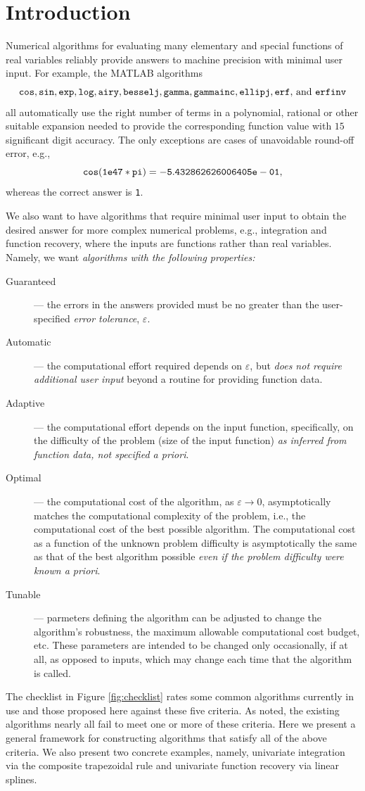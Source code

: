 \documentclass[]{elsarticle}
\theoremstyle{definition}
\theoremstyle{remark}
\begin{document}
\section{Introduction}

Numerical algorithms for evaluating many elementary and special functions of real variables reliably provide answers to machine precision with minimal user input.  For example, the MATLAB \cite{MAT7.12} algorithms
\[
{\tt cos, sin, exp, log, airy, besselj, gamma, gammainc, ellipj, erf,} \text{ and } {\tt  erfinv}
\] 
all automatically use the right number of terms in a polynomial, rational or other suitable expansion needed to provide the corresponding function value with $15$ significant digit accuracy. The only exceptions are cases of unavoidable round-off error, e.g., 
\[
{\tt cos(1e47*pi)= -5.432862626006405e-01},
\]
whereas the correct answer is {\tt 1}.

We also want to have algorithms that require minimal user input to obtain the desired answer for more complex numerical problems, e.g., integration and function recovery, where the inputs are functions rather than real variables.  Namely, we want \emph{algorithms with the following properties:}
\begin{description}
\item[Guaranteed]--- the errors in the answers provided must be no greater than the user-specified \emph{error tolerance}, $\varepsilon$.
\item[Automatic]--- the computational effort required depends on $\varepsilon$, but \emph{does not require additional user input} beyond a routine for providing function data.
\item[Adaptive]--- the computational effort depends on the input function, specifically, on the difficulty of the problem (size of the input function) \emph{as inferred from function data, not specified a priori}.
\item[Optimal]--- the computational cost of the algorithm, as $\varepsilon \to 0$, asymptotically matches the computational complexity of the problem, i.e., the computational cost of the best possible algorithm.  The computational cost as a function of the unknown problem difficulty is asymptotically the same as that of the best algorithm possible \emph{even if the problem difficulty were known a priori}.
\item[Tunable]--- parmeters defining the algorithm can be adjusted to change the algorithm's robustness, the maximum allowable computational cost budget, etc.  These parameters are intended to be changed only occasionally, if at all, as opposed to inputs, which may change each time that the algorithm is called.
\end{description}
The checklist in Figure \ref{fig:checklist} rates some common algorithms currently in use and those proposed here against these five criteria.  As noted, the existing algorithms nearly all fail to meet one or more of these criteria.  Here we present a general framework for constructing algorithms that satisfy all of the above criteria.  We also present two concrete examples, namely, univariate integration via the composite trapezoidal rule and univariate function recovery via linear splines.
\end{document}
